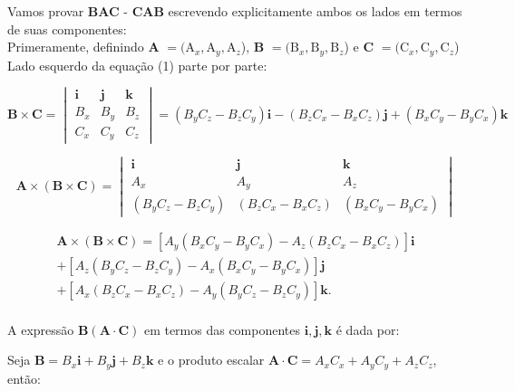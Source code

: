 \documentclass[a4paper,12pt]{article}
\begin{document}
Vamos provar \textbf{BAC} - \textbf{CAB} escrevendo explicitamente ambos os lados em termos de suas componentes:\\

Primeramente, definindo \textbf{A} $= (\textrm{A}_{x}, \textrm{A}_{y}, \textrm{A}_{z}$), \textbf{B} $= (\textrm{B}_{x}, \textrm{B}_{y}, \textrm{B}_{z}$) 
e \textbf{C} $= (\textrm{C}_{x}, \textrm{C}_{y}, \textrm{C}_{z}$)\\

Lado esquerdo da equa\c{c}\~ao (1) parte por parte:

\begin{equation}
    \mathbf{B} \times \mathbf{C} =
\begin{vmatrix}
\mathbf{i} & \mathbf{j} & \mathbf{k} \\
B_x & B_y & B_z \\
C_x & C_y & C_z
\end{vmatrix} =
(B_yC_z - B_zC_y)\mathbf{i} -
(B_zC_x - B_xC_z)\mathbf{j} +
(B_xC_y - B_yC_x)\mathbf{k}
\end{equation}


\begin{equation}
\mathbf{A} \times (\mathbf{B} \times \mathbf{C}) =
\begin{vmatrix}
\mathbf{i} & \mathbf{j} & \mathbf{k} \\
A_x & A_y & A_z \\
(B_yC_z - B_zC_y) & (B_zC_x - B_xC_z) & (B_xC_y - B_yC_x)
\end{vmatrix}
\end{equation}

\begin{equation}
    \begin{aligned}
    \mathbf{A} \times (\mathbf{B} \times \mathbf{C}) = \left[ A_y(B_xC_y - B_yC_x) - A_z(B_zC_x - B_xC_z) \right] \mathbf{i} \\ +
    \left[A_z(B_yC_z - B_zC_y) - A_x(B_xC_y - B_yC_x) \right] \mathbf{j}\\ +
    \left[ A_x(B_zC_x - B_xC_z) - A_y(B_yC_z - B_zC_y) \right] \mathbf{k}.
\end{aligned}
\end{equation}\\


A expressão \( \mathbf{B}(\mathbf{A} \cdot \mathbf{C}) \) em termos das componentes \( \mathbf{i}, \mathbf{j}, \mathbf{k} \) é dada por:

Seja \( \mathbf{B} = B_x \mathbf{i} + B_y \mathbf{j} + B_z \mathbf{k} \) e o produto escalar \( \mathbf{A} \cdot \mathbf{C} = A_x C_x + A_y C_y + A_z C_z \), então:
\end{document}
